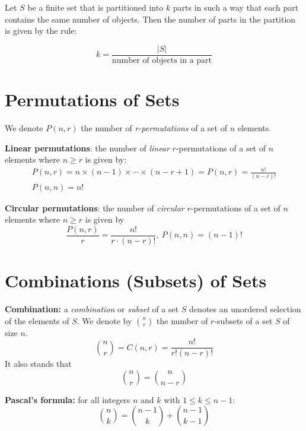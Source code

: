\documentclass[12pt]{article}
\begin{document}
Let $S$ be a finite set that is partitioned into $k$ parts in such a way that each part contains the same number of objects. Then the number of parts in the partition is given by the rule:

$$
k = \frac{|S|}{\text{number of objects in a part}}
$$

\section{Permutations of Sets}

We denote $P(n, r)$ the number of \textit{r-permutations} of a set of $n$ elements.

\textbf{Linear permutations}: the number of \textit{linear} $r$-permutations of a set of $n$ elements where $n \geq r$ is given by:
%
\begin{equation}
\begin{gathered}
P(n, r) = n \times (n - 1) \times \cdots \times (n - r + 1) = P(n, r) = \frac{n!}{(n - r)!} \\
P(n, n) = n!
\end{gathered}
\end{equation}

\textbf{Circular permutations}: the number of \textit{circular} $r$-permutations of a set of $n$ elements where $n \geq r$ is given by
%
\begin{equation}
\frac{P(n, r)}{r} = \frac{n!}{r \cdot (n - r)!}, \ P(n, n) =  (n - 1)!
\end{equation}

\section{Combinations (Subsets) of Sets}

\textbf{Combination:} a \textit{combination} or \textit{subset} of a set $S$ denotes an unordered selection of the elements of $S$.
%
We denote by $\binom n r$ the number of $r$-subsets of a set $S$ of size $n$.
%
\begin{equation}
\binom n r = C(n, r) = \frac{n!}{r! (n - r)!}
\end{equation}
%
It also stands that
%
\begin{equation}
	\binom{n}{r} = \binom{n}{n - r}
\end{equation}


\textbf{Pascal's formula:} for all integers $n$ and $k$ with $1 \leq k \leq n - 1$:
%
\begin{equation}
\binom n k = \binom{n - 1}{k} + \binom{n - 1}{k - 1}
\end{equation}
\end{document}
